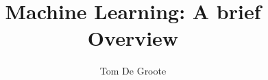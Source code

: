 \documentclass[openany]{book}
\author{Tom De Groote}
\title{Machine Learning: A brief Overview}
\begin{document}
\maketitle
\tableofcontents









\begin{appendices}

\end{appendices}
\end{document}
